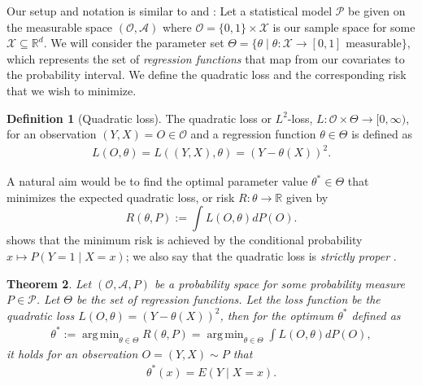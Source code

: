 \documentclass[11pt, a4paper]{article}
\newtheorem{theorem}{Theorem}
\theoremstyle{definition}
\newtheorem{definition}[theorem]{Definition}
\theoremstyle{remark}
\DeclareMathOperator*{\argmin}{arg\,min}
\newcommand{\btheta}{\theta}
\begin{document}
Our setup and notation is similar to \citet{vaart06} and \citet{laan03}:
Let a statistical model $ \mathcal{P} $ be given on the measurable space $ (\mathcal{O}, \mathcal{A}) $ where $ \mathcal{O} = \{0,1\} \times \mathcal{X} $ is our sample space for some $ \mathcal{X} \subseteq \mathbb{R}^{d} $. 
We will consider the parameter set $ \Theta = \{\btheta \mid \btheta : \mathcal{X} \to [0,1] \text{ measurable}\} $, which represents the set of \textit{regression functions} that map from our covariates to the probability interval. We define the quadratic loss and the corresponding risk that we wish to minimize.
\begin{definition}[Quadratic loss]
    The quadratic loss or $ L^2 $-loss, $ L : \mathcal{O} \times \Theta \to [0, \infty) $, for an observation $ (Y, X) = O \in \mathcal{O} $ and a regression function $ \btheta \in \Theta $ is defined as 
\begin{align*}
    L(O, \btheta) = L((Y, X), \btheta) = (Y - \btheta(X))^2.
\end{align*}
\end{definition}
A natural aim would be to find the optimal parameter value $\btheta^* \in \Theta$ that minimizes the expected quadratic loss, or risk $R: \btheta \to \mathbb{R}$ given by 
\begin{equation} \label{l2risk}
    R(\btheta, P) := \int L(O, \btheta)  dP(O).
\end{equation}
 shows that the minimum risk is achieved by the conditional probability $ x \mapsto P(Y = 1\mid X = x) $; we also say that the quadratic loss is \textit{strictly proper} \parencite{gneiting2007strictly}. 
\begin{theorem} \label{minrisk}
    Let $ (\mathcal{O} , \mathcal{A}, P) $ be a probability space for some probability measure $ P \in \mathcal{P} $. Let $ \Theta $ be the set of regression functions. Let the loss function be the quadratic loss $ L(O, \btheta) = (Y - \btheta(X))^2 $, then for the optimum $ \btheta^* $ defined as 
    \begin{align*}
        \btheta^* := \argmin_{\btheta \in \Theta} R(\btheta, P)= \argmin_{\btheta \in \Theta} \int L(O, \btheta)  dP(O),
    \end{align*}
    it holds for an observation $ O = (Y, X) \sim P $ that
    \begin{align*}
        \btheta^{*}(x) = E(Y \mid X = x).
    \end{align*}
\end{theorem}
\end{document}
